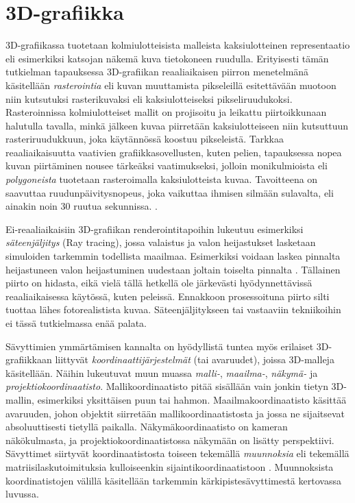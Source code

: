 \documentclass[finnish]{tktltiki2}
\theoremstyle{definition}
\theoremstyle{remark}
\begin{document}
\section{3D-grafiikka}

3D-grafiikassa tuotetaan kolmiulotteisista malleista kaksiulotteinen representaatio eli esimerkiksi katsojan näkemä kuva tietokoneen ruudulla. Erityisesti tämän tutkielman tapauksessa 3D-grafiikan reaaliaikaisen piirron menetelmänä käsitellään \emph{rasterointia} eli kuvan muuttamista pikseleillä esitettävään muotoon niin kutsutuksi rasterikuvaksi eli kaksiulotteiseksi pikseliruudukoksi. Rasteroinnissa kolmiulotteiset mallit on projisoitu ja leikattu piirtoikkunaan halutulla tavalla, minkä jälkeen kuvaa piirretään kaksiulotteiseen niin kutsuttuun rasteriruudukkuun, joka käytännössä koostuu pikseleistä. Tarkkaa reaaliaikaisuutta vaativien grafiikkasovellusten, kuten pelien, tapauksessa nopea kuvan piirtäminen nousee tärkeäksi vaatimukseksi, jolloin monikulmioista eli \emph{polygoneista} tuotetaan rasteroimalla kaksiulotteista kuvaa. Tavoitteena on saavuttaa ruudunpäivitysnopeus, joka vaikuttaa ihmisen silmään sulavalta, eli ainakin noin 30 ruutua sekunnissa. \cite[s. 444-445]{Gre14}. 

Ei-reaaliaikaisiin 3D-grafiikan renderointitapoihin lukeutuu esimerkiksi \emph{säteenjäljitys} (Ray tracing), jossa valaistus ja valon heijastukset lasketaan simuloiden tarkemmin todellista maailmaa. Esimerkiksi voidaan laskea pinnalta heijastuneen valon heijastuminen uudestaan joltain toiselta pinnalta \cite[s.405-406]{Puh08}. Tällainen piirto on hidasta, eikä vielä tällä hetkellä ole järkevästi hyödynnettävissä reaaliaikaisessa käytössä, kuten peleissä. Ennakkoon prosessoituna piirto silti tuottaa lähes fotorealistista kuvaa. Säteenjäljitykseen tai vastaaviin tekniikoihin ei tässä tutkielmassa enää palata.

Sävyttimien ymmärtämisen kannalta on hyödyllistä tuntea myös erilaiset 3D-grafiikkaan liittyvät \emph{koordinaattijärjestelmät} (tai avaruudet), joissa 3D-malleja käsitellään. Näihin lukeutuvat muun muassa \emph{malli-}, \emph{maailma-}, \emph{näkymä-} ja \emph{projektiokoordinaatisto}. Mallikoordinaatisto pitää sisällään vain jonkin tietyn 3D-mallin, esimerkiksi yksittäisen puun tai hahmon. Maailmakoordinaatisto käsittää avaruuden, johon objektit siirretään mallikoordinaatistosta ja jossa ne sijaitsevat absoluuttisesti tietyllä paikalla. Näkymäkoordinaatisto on kameran näkökulmasta, ja projektiokoordinaatistossa näkymään on lisätty perspektiivi. Sävyttimet siirtyvät koordinaatistosta toiseen tekemällä \emph{muunnoksia} eli tekemällä matriisilaskutoimituksia kulloiseenkin sijaintikoordinaatistoon \cite[s. 167-171]{Puh08}. Muunnoksista koordinatistojen välillä käsitellään tarkemmin kärkipistesävyttimestä kertovassa luvussa.
\end{document}
